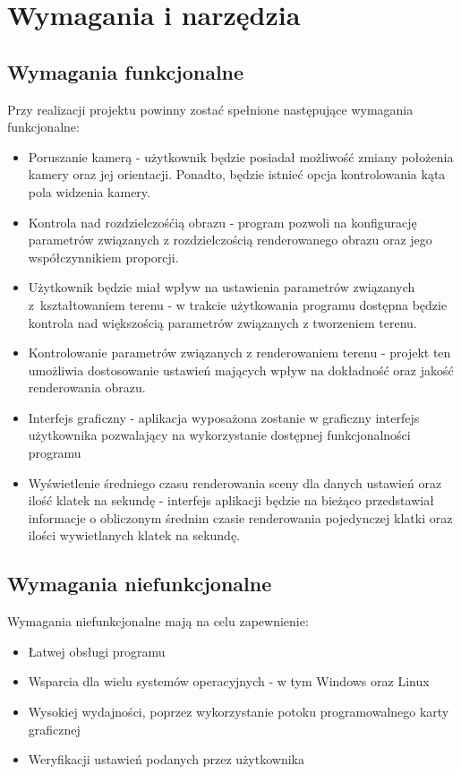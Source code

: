 \chapter{Wymagania i narzędzia}
\label{ch:wymagania-i-narzedzia}

\section{Wymagania funkcjonalne}
Przy realizacji projektu powinny zostać spełnione następujące wymagania funkcjonalne:
\begin{itemize}
\item Poruszanie kamerą -
  użytkownik będzie posiadał możliwość zmiany położenia kamery oraz jej orientacji. Ponadto, będzie istnieć opcja kontrolowania kąta pola widzenia kamery.
\item Kontrola nad rozdzielczośćią obrazu -
  program pozwoli na konfigurację parametrów związanych z rozdzielczością renderowanego obrazu oraz jego współczynnikiem proporcji.
\item Użytkownik będzie miał wpływ na ustawienia parametrów związanych z~kształtowaniem terenu -
  w trakcie użytkowania programu dostępna będzie kontrola nad większością parametrów związanych z tworzeniem terenu.
\item Kontrolowanie parametrów związanych z renderowaniem terenu -
  projekt ten umożliwia dostosowanie ustawień mających wpływ
  na dokładność oraz jakość renderowania obrazu.
\item Interfejs graficzny -
  aplikacja wyposażona zostanie w graficzny interfejs użytkownika pozwalający na wykorzystanie dostępnej funkcjonalności programu

\item Wyświetlenie średniego czasu renderowania sceny dla danych ustawień oraz ilość klatek na sekundę -
  interfejs aplikacji będzie na bieżąco przedstawiał informacje o obliczonym średnim czasie renderowania pojedynczej klatki oraz ilości wywietlanych klatek na sekundę.

\end{itemize}


\section{Wymagania niefunkcjonalne}
Wymagania niefunkcjonalne mają na celu zapewnienie:
\begin{itemize}
\item Łatwej obsługi programu
\item Wsparcia dla wielu systemów operacyjnych - w tym Windows oraz Linux
\item Wysokiej wydajności, poprzez wykorzystanie potoku programowalnego karty graficznej
\item Weryfikacji ustawień podanych przez użytkownika
\end{itemize}

